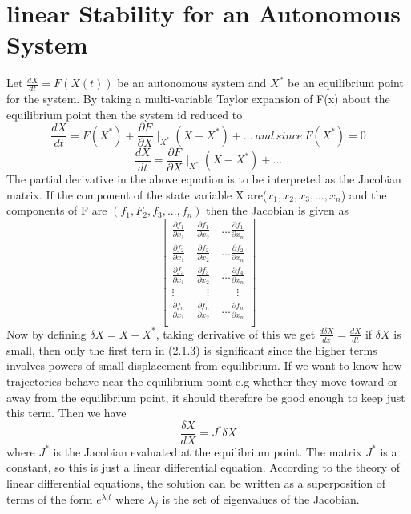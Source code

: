 \documentclass[a4paper,12pt]{report}
\numberwithin{equation}{section}
\begin{document}
\section{linear Stability for an Autonomous System}
Let $ \frac{dX}{dt}=F(X(t))$ be an autonomous system and $ X^*$ be an equilibrium point for the system. By taking a multi-variable Taylor expansion of F(x) about the equilibrium point then the system id reduced to 
\begin{equation}
\frac{dX}{dt}= F(X^*)+ \frac{\partial F}{\partial X}\displaystyle \mid_{X^*} (X-X^{*})+ . . . \ and \ since \ F(X^*)=0
\end{equation}
\begin{equation}
\frac{dX}{dt}= \frac{\partial F}{\partial X} \mid_{X^*} (X - X^*)+ . . . 
\end{equation}
The partial derivative in the above equation is to be interpreted as the Jacobian matrix. If the component of the state variable X are($x_{1}, x_{2}, x_{3},. . . , x_{n}$) and the components of F are $(f_{1},F_{2},f_{3},...,f_{n})$ then the Jacobian is given as 
\begin{equation}
\left[\begin{matrix}
\frac{\partial f_{1}}{\partial x_1} \quad \frac{\partial f_{1}}{\partial x_{2}} \quad \hdots  \frac{\partial f_{1}}{\partial x_{n}} \\
\frac{\partial f_{2}}{\partial x_1} \quad \frac{\partial f_{2}}{\partial x_{2}} \quad \hdots  \frac{\partial f_{2}}{\partial x_{n}} \\
\frac{\partial f_{3}}{\partial x_1} \quad \frac{\partial f_{3}}{\partial x_{2}} \quad \hdots  \frac{\partial f_{4}}{\partial x_{n}} \\
\vdots \ \ \qquad \ \ \vdots \qquad \ \ \vdots \\
\frac{\partial f_{n}}{\partial x_1} \quad \frac{\partial f_{n}}{\partial x_{2}} \quad \hdots  \frac{\partial f_{n}}{\partial x_{n}} \\
\end{matrix}\right]
\end{equation} 
Now by defining $\delta X=X-X^*$, taking derivative of this we get $\frac{d\delta X}{dx}= \frac{dX}{dt} $ if $ \delta X $ is small, then only the first tern in (2.1.3) is significant since the higher terms involves powers of small displacement from equilibrium. If we want to know how trajectories behave near the equilibrium point e.g whether they move toward or away from the equilibrium point, it should therefore be good enough to keep just this term. Then we have 
\begin{equation}
\frac{\delta X}{dX}= J^* \delta X
\end{equation}
where $ J^* $ is the Jacobian evaluated at the equilibrium point. The matrix $ J^*$  is a constant, so this is just a linear differential equation. According to the theory of linear differential equations, the solution can be written as a superposition of terms of the form $e^{\lambda _{i}t}$ where {$\lambda _{j} $} is the set of eigenvalues of the Jacobian.
\end{document}
